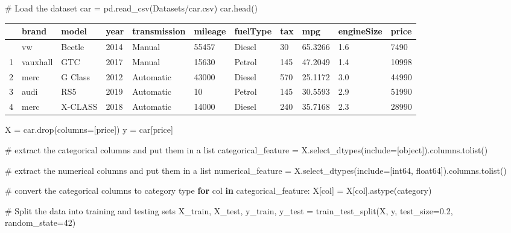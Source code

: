 \documentclass[
  letterpaper,
  DIV=11,
  numbers=noendperiod]{scrreprt}
\newenvironment{Shaded}{\begin{snugshade}}{\end{snugshade}}
\newcommand{\CommentTok}[1]{\textcolor[rgb]{0.37,0.37,0.37}{#1}}
\newcommand{\ControlFlowTok}[1]{\textcolor[rgb]{0.00,0.23,0.31}{\textbf{#1}}}
\newcommand{\DecValTok}[1]{\textcolor[rgb]{0.68,0.00,0.00}{#1}}
\newcommand{\FloatTok}[1]{\textcolor[rgb]{0.68,0.00,0.00}{#1}}
\newcommand{\KeywordTok}[1]{\textcolor[rgb]{0.00,0.23,0.31}{\textbf{#1}}}
\newcommand{\NormalTok}[1]{\textcolor[rgb]{0.00,0.23,0.31}{#1}}
\newcommand{\OperatorTok}[1]{\textcolor[rgb]{0.37,0.37,0.37}{#1}}
\newcommand{\StringTok}[1]{\textcolor[rgb]{0.13,0.47,0.30}{#1}}
\begin{document}
\begin{Shaded}
\begin{Highlighting}[]
\CommentTok{\# Load the dataset}
\NormalTok{car }\OperatorTok{=}\NormalTok{ pd.read\_csv(}\StringTok{\textquotesingle{}Datasets/car.csv\textquotesingle{}}\NormalTok{)}
\NormalTok{car.head()}
\end{Highlighting}
\end{Shaded}

\begin{longtable}[]{@{}lllllllllll@{}}
\toprule\noalign{}
& brand & model & year & transmission & mileage & fuelType & tax & mpg &
engineSize & price \\
\midrule\noalign{}
\endhead
\bottomrule\noalign{}
\endlastfoot
0 & vw & Beetle & 2014 & Manual & 55457 & Diesel & 30 & 65.3266 & 1.6 &
7490 \\
1 & vauxhall & GTC & 2017 & Manual & 15630 & Petrol & 145 & 47.2049 &
1.4 & 10998 \\
2 & merc & G Class & 2012 & Automatic & 43000 & Diesel & 570 & 25.1172 &
3.0 & 44990 \\
3 & audi & RS5 & 2019 & Automatic & 10 & Petrol & 145 & 30.5593 & 2.9 &
51990 \\
4 & merc & X-CLASS & 2018 & Automatic & 14000 & Diesel & 240 & 35.7168 &
2.3 & 28990 \\
\end{longtable}

\begin{Shaded}
\begin{Highlighting}[]
\NormalTok{X }\OperatorTok{=}\NormalTok{ car.drop(columns}\OperatorTok{=}\NormalTok{[}\StringTok{\textquotesingle{}price\textquotesingle{}}\NormalTok{])}
\NormalTok{y }\OperatorTok{=}\NormalTok{ car[}\StringTok{\textquotesingle{}price\textquotesingle{}}\NormalTok{]}

\CommentTok{\# extract the categorical columns and put them in a list}
\NormalTok{categorical\_feature }\OperatorTok{=}\NormalTok{ X.select\_dtypes(include}\OperatorTok{=}\NormalTok{[}\StringTok{\textquotesingle{}object\textquotesingle{}}\NormalTok{]).columns.tolist()}

\CommentTok{\# extract the numerical columns and put them in a list}
\NormalTok{numerical\_feature }\OperatorTok{=}\NormalTok{ X.select\_dtypes(include}\OperatorTok{=}\NormalTok{[}\StringTok{\textquotesingle{}int64\textquotesingle{}}\NormalTok{, }\StringTok{\textquotesingle{}float64\textquotesingle{}}\NormalTok{]).columns.tolist()}

\CommentTok{\# convert the categorical columns to category type}
\ControlFlowTok{for}\NormalTok{ col }\KeywordTok{in}\NormalTok{ categorical\_feature:}
\NormalTok{    X[col] }\OperatorTok{=}\NormalTok{ X[col].astype(}\StringTok{\textquotesingle{}category\textquotesingle{}}\NormalTok{)}


\CommentTok{\# Split the data into training and testing sets}
\NormalTok{X\_train, X\_test, y\_train, y\_test }\OperatorTok{=}\NormalTok{ train\_test\_split(X, y, test\_size}\OperatorTok{=}\FloatTok{0.2}\NormalTok{, random\_state}\OperatorTok{=}\DecValTok{42}\NormalTok{)}
\end{Highlighting}
\end{Shaded}
\end{document}
